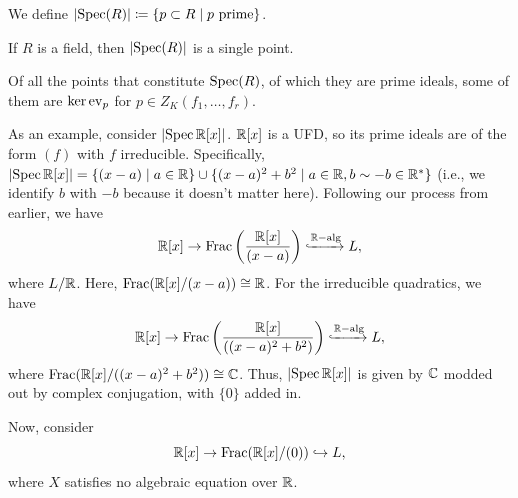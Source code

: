 \begin{definition}
    We define $\left\lvert \operatorname{Spec}(R) \right\rvert \coloneq \{p \subset R \mid p \text{ prime}\}$.
\end{definition}
\begin{corollary}
    If $R$ is a field, then $\left\lvert \operatorname{Spec}(R) \right\rvert$ is a single point.
\end{corollary}
Of all the points that constitute $\operatorname{Spec}(R)$, of which they are prime ideals, some of them are $\ker \operatorname{ev}_p$ for $p \in Z_K(f_1, \dots, f_r)$.

As an example, consider $\left\lvert \operatorname{Spec} \mathbb R[x] \right\rvert$. $\mathbb R[x]$ is a UFD, so its prime ideals are of the form $(f)$ with $f$ irreducible. Specifically, $\left\lvert \operatorname{Spec} \mathbb R[x] \right\rvert = \{(x - a) \mid a \in \mathbb R\} \cup \{(x - a)^2 + b^2 \mid a \in \mathbb R, b \sim -b \in \mathbb R^\ast\}$ (i.e., we identify $b$ with $-b$ because it doesn't matter here). Following our process from earlier, we have
\[ \mathbb R[x] \to \operatorname{Frac}\left(\frac{\mathbb R[x]}{(x - a)}\right) \xhookrightarrow[]{\mathbb R-\operatorname{alg}} L, \]
where $L/\mathbb R$. Here, $\operatorname{Frac}(\mathbb R[x]/(x-a)) \cong \mathbb R$. For the irreducible quadratics, we have
\[ \mathbb R[x] \to \operatorname{Frac}\left(\frac{\mathbb R[x]}{((x-a)^2 + b^2)}\right) \xhookrightarrow[]{\mathbb R-\operatorname{alg}} L, \]
where $\operatorname{Frac}(\mathbb R[x]/((x-a)^2 + b^2)) \cong \mathbb C$. Thus, $\left\lvert \operatorname{Spec} \mathbb R[x] \right\rvert$ is given by $\mathbb C$ modded out by complex conjugation, with $\{0\}$ added in.

Now, consider
\[ \mathbb R[x] \to \operatorname{Frac}(\mathbb R[x]/(0)) \hookrightarrow L, \]
where $X$ satisfies no algebraic equation over $\mathbb R$.